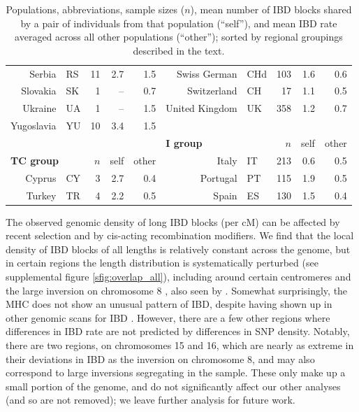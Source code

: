 \documentclass{article}
\begin{document}
\begin{table}[!htp]
\begin{center}
\begin{tabular}{|rlrrr||rlrrr|}
Serbia                  &   RS    &  11 &  2.7 & 1.5   & Swiss German  &  CHd              & 103 &  1.6 & 0.6   \\
Slovakia                &   SK    &   1 &   -- & 0.7   & Switzerland   &   CH              &  17 &  1.1 & 0.5   \\
Ukraine                 &   UA    &   1 &   -- & 1.5   & United Kingdom&   UK              & 358 &  1.2 & 0.7   \\
Yugoslavia              &   YU    &  10 &  3.4 & 1.5   &               &                   &     &      &       \\ \cline{6-10}
                        &         &     &      &       & \multicolumn{2}{|l}{\bf I group}  &  $n$& self & other \\ \cline{1-10}
\multicolumn{2}{|l}{\bf TC group} &  $n$& self & other & Italy         &   IT              & 213 &  0.6 & 0.5   \\ \cline{1-5}
Cyprus                  &   CY    &   3 &  2.7 & 0.4   & Portugal      &   PT              & 115 &  1.9 & 0.5   \\
Turkey                  &   TR    &   4 &  2.2 & 0.5   & Spain         &   ES              & 130 &  1.5 & 0.4   \\
\hline
\end{tabular}
\caption{
Populations, abbreviations, sample sizes ($n$), 
mean number of IBD blocks shared by a pair of individuals from that population (``self''),
and mean IBD rate averaged across all other populations (``other'');
sorted by regional groupings described in the text.
\label{tab:ibd_summaries}
}
\end{center}
\end{table}

The observed genomic density of long IBD blocks (per cM) 
can be affected by recent selection \citep{albrechtsen2010natural} and
by cis-acting recombination modifiers.
We find that the local density of IBD blocks of all lengths is relatively constant across the genome,
but in certain regions the length distribution is systematically perturbed
(see supplemental figure \ref{sfig:overlap_all}),
including around certain centromeres
and the large inversion on chromosome 8 \citep{giglio2001olfactory},
also seen by \citet{albrechtsen2010natural}.
Somewhat surprisingly, the MHC does not show an unusual pattern of IBD, 
despite having shown up in other genomic scans for IBD \citep{albrechtsen2010natural,gusev2012homologous}. 
However, there are a few other regions where differences in IBD rate are not predicted by differences in SNP density. 
Notably, there are two regions, on chromosomes 15 and 16, 
which are nearly as extreme in their deviations in IBD as the inversion on chromosome 8, 
and may also correspond to large inversions segregating in the sample.
These only make up a small portion of the genome, and do not significantly affect our other analyses (and so are not removed);
we leave further analysis for future work.
\end{document}
